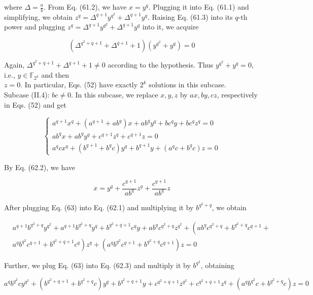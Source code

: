 \documentclass[10pt]{article}
\begin{document}
where $\Delta=\frac{a}{b}$. From Eq. (61.2), we have $x=y^{q}$. Plugging it into Eq. (61.1) and simplifying, we obtain $z^{q}=\Delta^{q+1} y^{q^{2}}+\Delta^{q+1} y^{q}$. Raising Eq. (61.3) into its $q$-th power and plugging $z^{q}=\Delta^{q+1} y^{q^{2}}+\Delta^{q+1} y^{q}$ into it, we acquire

$$
\left(\Delta^{q^{2}+q+1}+\Delta^{q+1}+1\right)\left(y^{q^{2}}+y^{q}\right)=0
$$

Again, $\Delta^{q^{2}+q+1}+\Delta^{q+1}+1 \neq 0$ according to the hypothesis. Thus $y^{q^{2}}+y^{q}=0$, i.e., $y \in \mathbb{F}_{2^{k}}$ and then\\
$z=0$. In particular, Eqs. (52) have exactly $2^{k}$ solutions in this subcase.\\
Subcase (II.4): $b c \neq 0$. In this subcase, we replace $x, y, z$ by $a x, b y, c z$, respectively in Eqs. (52) and get

\[
\left\{\begin{array}{l}
a^{q+1} x^{q}+\left(a^{q+1}+a b^{q}\right) x+a b^{q} y^{q}+b c^{q} y+b c^{q} z^{q}=0  \tag{62.1}\\
a b^{q} x+a b^{q} y^{q}+c^{q+1} z^{q}+c^{q+1} z=0 \\
a^{q} c x^{q}+\left(b^{q+1}+b^{q} c\right) y^{q}+b^{q+1} y+\left(a^{q} c+b^{q} c\right) z=0
\end{array}\right.
\]

By Eq. (62.2), we have


\begin{equation*}
x=y^{q}+\frac{c^{q+1}}{a b^{q}} z^{q}+\frac{c^{q+1}}{a b^{q}} z \tag{63}
\end{equation*}


After plugging Eq. (63) into Eq. (62.1) and multiplying it by $b^{q^{2}+q}$, we obtain


\begin{align*}
& a^{q+1} b^{q^{2}+q} y^{q^{2}}+a^{q+1} b^{q^{2}+q} y^{q}+b^{q^{2}+q+1} c^{q} y+a b^{q} c^{q^{2}+q} z^{q^{2}}+\left(a b^{q} c^{q^{2}+q}+b^{q^{2}+q} c^{q+1}+\right. \\
& \left.a^{q} b^{q^{2}} c^{q+1}+b^{q^{2}+q+1} c^{q}\right) z^{q}+\left(a^{q} b^{q^{2}} c^{q+1}+b^{q^{2}+q} c^{q+1}\right) z=0 \tag{64}
\end{align*}


Further, we plug Eq. (63) into Eq. (62.3) and multiply it by $b^{q^{2}}$, obtaining


\begin{equation*}
a^{q} b^{q^{2}} c y^{q^{2}}+\left(b^{q^{2}+q+1}+b^{q^{2}+q} c\right) y^{q}+b^{q^{2}+q+1} y+c^{q^{2}+q+1} z^{q^{2}}+c^{q^{2}+q+1} z^{q}+\left(a^{q} b^{q^{2}} c+b^{q^{2}+q} c\right) z=0 \tag{65}
\end{equation*}
\end{document}
